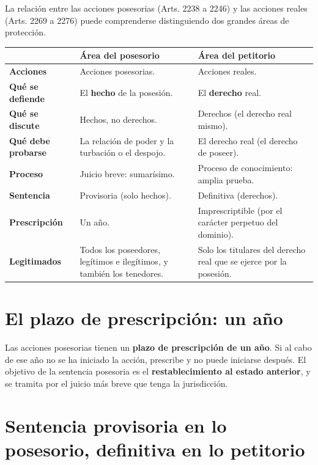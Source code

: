 \documentclass[12pt,oneside]{book}
\begin{document}
La relación entre las acciones posesorias (Arts. 2238 a 2246) y las acciones reales (Arts. 2269 a 2276) puede comprenderse distinguiendo dos grandes áreas de protección.

\begin{table}[H]
\centering
\begin{tabularx}{\textwidth}{
    >{\raggedright\arraybackslash}p{}
    >{\raggedright\arraybackslash}X
    >{\raggedright\arraybackslash}X
}
\toprule
 & \textbf{Área del posesorio} & \textbf{Área del petitorio} \\
\midrule
\textbf{Acciones} & Acciones posesorias. & Acciones reales. \\
\textbf{Qué se defiende} & El \textbf{hecho} de la posesión. & El \textbf{derecho} real. \\
\textbf{Qué se discute} & Hechos, no derechos. & Derechos (el derecho real mismo). \\
\textbf{Qué debe probarse} & La relación de poder y la turbación o el despojo. & El derecho real (el derecho de poseer). \\
\textbf{Proceso} & Juicio breve: sumarísimo. & Proceso de conocimiento: amplia prueba. \\
\textbf{Sentencia} & Provisoria (solo hechos). & Definitiva (derechos). \\
\textbf{Prescripción} & Un año. & Imprescriptible (por el carácter perpetuo del dominio). \\
\textbf{Legitimados} & Todos los poseedores, legítimos e ilegítimos, y también los tenedores. & Solo los titulares del derecho real que se ejerce por la posesión. \\
\bottomrule
\end{tabularx}
\end{table}

\section{El plazo de prescripción: un año}

Las acciones posesorias tienen un \textbf{plazo de prescripción de un año}. Si al cabo de ese año no se ha iniciado la acción, prescribe y no puede iniciarse después. El objetivo de la sentencia posesoria es el \textbf{restablecimiento al estado anterior}, y se tramita por el juicio más breve que tenga la jurisdicción.

\section{Sentencia provisoria en lo posesorio, definitiva en lo petitorio}
\end{document}
